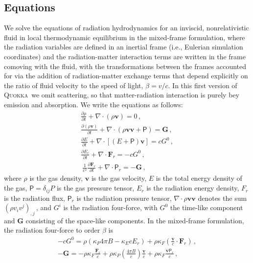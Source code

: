\documentclass[fleqn,usenatbib]{mnras}
\newcommand{\vc}[1]{{\mathbf{#1}}}
\newcommand{\quokka}{\textsc{Quokka}}
\begin{document}
\subsection{Equations}
We solve the equations of radiation hydrodynamics \citep{Pomraning_1973,Mihalas_1984,Castor_2004} for an inviscid, nonrelativistic fluid in local thermodynamic equilibrium in the mixed-frame formulation, where the radiation variables are defined in an inertial frame (i.e., Eulerian simulation coordinates) and the radiation-matter interaction terms are written in the frame comoving with the fluid, with the transformations between the frames accounted for via the addition of radiation-matter exchange terms that depend explicitly on the ratio of fluid velocity to the speed of light, $\beta=v/c$. In this first version of \quokka~we omit scattering, so that matter-radiation interaction is purely bey emission and absorption. We write the equations as follows:
\begin{align}
    \frac{\partial \rho}{\partial t} + \nabla \cdot (\rho \vc{v}) = 0 \, , \\
    \frac{\partial (\rho \vc{v})}{\partial t} + \nabla \cdot (\rho \vc{v} \vc{v} + \mathsf{P}) = \vc{G} \, , \\
    \frac{\partial E}{\partial t} + \nabla \cdot \left[(E + \mathsf{P})\vc{v}\right] = c G^0 \, , \\
    \frac{\partial E_r}{\partial t} + \nabla \cdot {\vc{F}_r} = -c G^0 \, , \\\
    \frac{1}{c^2}\frac{\partial \vc{F}_r}{\partial t} + \nabla \cdot \mathsf{P}_r = -\vc{G} \, ,
\end{align}
where $\rho$ is the gas density, $\vc{v}$ is the gas velocity, $E$ is the total energy density of the gas, $\mathsf{P} = \delta_{ij} P$ is the gas pressure tensor, $E_r$ is the radiation energy density, $F_r$ is the radiation flux, $\mathsf{P}_r$ is the radiation pressure tensor, $\nabla \cdot \rho \vc{v} \vc{v}$ denotes the sum $(\rho v_i v^j)_{,j}\,$, and $G^i$ is the radiation four-force, with $G^0$ the time-like component and $\vc{G}$ consisting of the space-like components. In the mixed-frame formulation, the radiation four-force to order $\beta$ is
\begin{align}
-c G^0 = \rho (\kappa_P 4 \pi B - \kappa_E c E_r) + \rho \kappa_F \left( \frac{\vc{v}}{c} \cdot \vc{F}_r \right) \, , \\
-\vc{G} = -\rho \kappa_F \frac{\vc{F}_r}{c} + \rho \kappa_P \left(\frac{4 \pi B}{c}\right) \frac{\vc{v}}{c} + \rho \kappa_F \frac{\vc{v}\mathsf{P}_r}{c} \, ,
\end{align}
\end{document}
